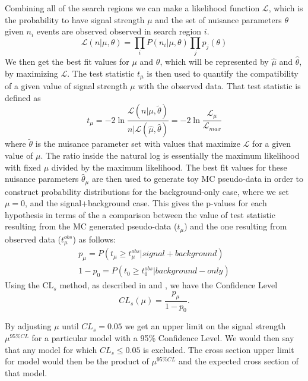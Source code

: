 Combining all of the search regions we can make a likelihood function $\mathcal{L}$, which is the probability to have signal strength $\mu$ and the set of nuisance parameters $\theta$ given $n_i$ events are observed observed in search region $i$.
\begin{equation}
	\mathcal{L}(n|\mu,\theta) = \prod_{i}P(n_i|\mu, \theta)\prod_{j}p_j(\theta)
\end{equation} 
We then get the best fit values for $\mu$ and $\theta$, which will be represented by $\hat{\mu}$ and $\hat{\theta}$, by maximizing $\mathcal{L}$.  The test statistic $t_\mu$ is then used to quantify the compatibility of a given value of signal strength $\mu$ with the observed data.  That test statistic is defined as
\begin{equation}
	t_\mu = -2\ln \frac{\mathcal{L}(n|\mu, \tilde{\theta})}{n|\mathcal{L}(\hat{\mu}, \hat{\theta})} = -2\ln \frac{\mathcal{L}_\mu}{\mathcal{L}_{max}}
\end{equation}
where $\tilde{\theta}$ is the nuisance parameter set with values that maximize $\mathcal{L}$ for a given value of $\mu$.  The ratio inside the natural log is essentially the maximum likelihood with fixed $\mu$ divided by the maximum likelihood.  The best fit values for these nuisance parameters $\hat{\theta}_\mu$ are then used to generate toy MC pseudo-data in order to construct probability distributions for the background-only case, where we set $\mu=0$, and the signal+background case.  This gives the p-values for each hypothesis in terms of the a comparison between the value of test statistic resulting from the MC generated pseudo-data ($t_\mu$) and the one resulting from observed data ($t_\mu^{obs}$) as follows:
\begin{eqnarray}
	p_\mu = P(t_\mu \geq t_\mu^{obs}|signal + background) \\
	1-p_0 = P(t_0 \geq t_0^{obs}|background-only)
\end{eqnarray} 
Using the CL$_s$ method, as described in \cite{Junk:1999kv} and \cite{Read:2002hq}, we have the Confidence Level 
\begin{equation}
	CL_s(\mu) = \frac{p_\mu}{1-p_0}.
\end{equation}

By adjusting $\mu$ until $CL_s = 0.05$ we get an upper limit on the signal strength $\mu^{95\%CL}$ for a particular model with a 95\% Confidence Level.  We would then say that any model for which $CL_s \leq 0.05$ is excluded.  The cross section upper limit for model would then be the product of $\mu^{95\%CL}$ and the expected cross section of that model.

